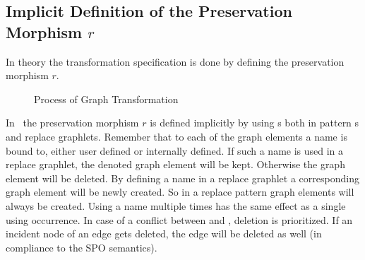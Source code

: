 \subsection{Implicit Definition of the Preservation Morphism $r$}
\label{rule:morphismr}
In theory the transformation specification is done by defining the preservation morphism $r$.
\begin{figure}[htbp]
	\centering
  \caption{Process of Graph Transformation}
  \label{rule:figrule}
\end{figure}
In \GrG\, the preservation morphism $r$ is defined implicitly by using s both in pattern s and replace graphlets.
Remember that to each of the graph elements a name is bound to, either user defined or internally defined. If such a name is used in a replace graphlet, the denoted graph element will be kept.
Otherwise the graph element will be deleted.
By defining a name in a replace graphlet a corresponding graph element will be newly created.
So in a replace pattern  graph elements will always be created.
Using a name multiple times has the same effect as a single using occurrence.
In case of a conflict between  and , deletion is prioritized.
If an incident node of an edge gets deleted, the edge will be deleted as well (in compliance to the SPO semantics).

